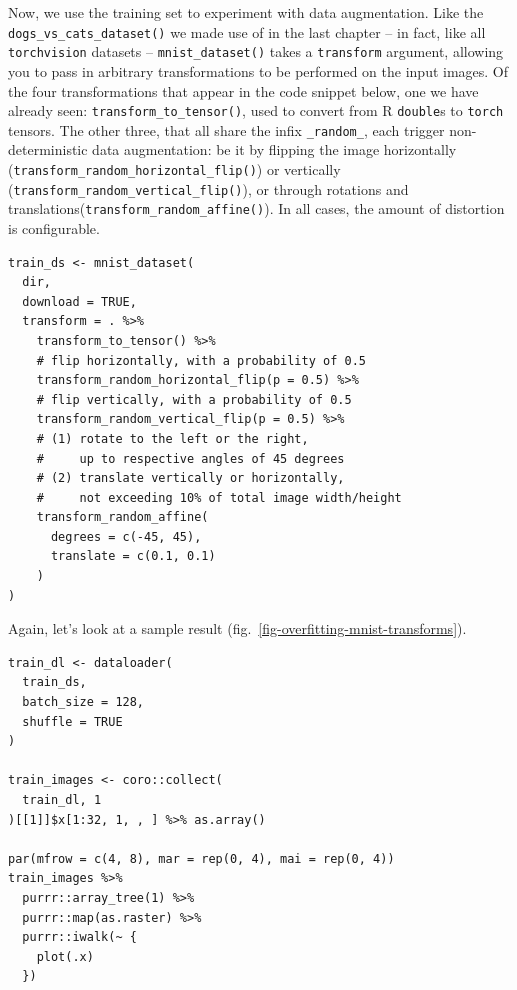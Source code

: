 \documentclass[
  letterpaper,
]{krantz}
\begin{document}
Now, we use the training set to experiment with data
augmentation. Like the
\texttt{dogs\_vs\_cats\_dataset()} we made use of in the last chapter --
in fact, like all \texttt{torchvision} datasets --
\texttt{mnist\_dataset()} takes a \texttt{transform} argument, allowing
you to pass in arbitrary transformations to be performed on the input
images. Of the four transformations that appear in the code snippet
below, one we have already seen: \texttt{transform\_to\_tensor()}, used
to convert from R \texttt{double}s to \texttt{torch} tensors. The other
three, that all share the infix \texttt{\_random\_}, each trigger
non-deterministic data augmentation: be it by flipping the image
horizontally (\texttt{transform\_random\_horizontal\_flip()}) or
vertically (\texttt{transform\_random\_vertical\_flip()}), or through
rotations and translations(\texttt{transform\_random\_affine()}). In all
cases, the amount of distortion is configurable.

\begin{verbatim}
train_ds <- mnist_dataset(
  dir,
  download = TRUE,
  transform = . %>%
    transform_to_tensor() %>%
    # flip horizontally, with a probability of 0.5
    transform_random_horizontal_flip(p = 0.5) %>%
    # flip vertically, with a probability of 0.5
    transform_random_vertical_flip(p = 0.5) %>%
    # (1) rotate to the left or the right,
    #     up to respective angles of 45 degrees
    # (2) translate vertically or horizontally,
    #     not exceeding 10% of total image width/height
    transform_random_affine(
      degrees = c(-45, 45),
      translate = c(0.1, 0.1)
    )
)
\end{verbatim}

Again, let's look at a sample result
(fig.~\ref{fig-overfitting-mnist-transforms}).

\begin{verbatim}
train_dl <- dataloader(
  train_ds,
  batch_size = 128,
  shuffle = TRUE
)

train_images <- coro::collect(
  train_dl, 1
)[[1]]$x[1:32, 1, , ] %>% as.array()

par(mfrow = c(4, 8), mar = rep(0, 4), mai = rep(0, 4))
train_images %>%
  purrr::array_tree(1) %>%
  purrr::map(as.raster) %>%
  purrr::iwalk(~ {
    plot(.x)
  })
\end{verbatim}
\end{document}
